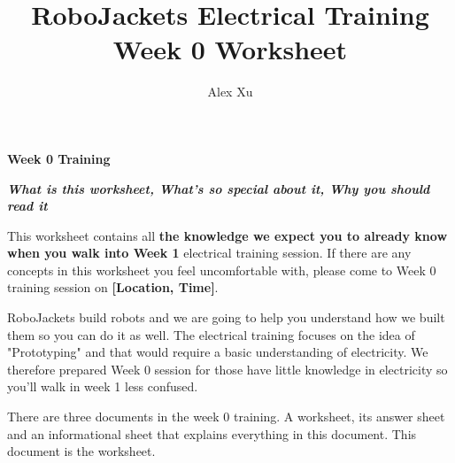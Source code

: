 \documentclass{article}
\title{RoboJackets Electrical Training Week 0 Worksheet}
\author{Alex Xu}
\begin{document}
\maketitle{}
\setcounter{tocdepth}{2}
\tableofcontents

\vspace{60pt}\Large{\textbf{Week 0 Training}}\vspace{6pt}\par
\large{\textit{\textbf{What is this worksheet, What's so special about it, Why you should read it}}} \vspace{6pt}\par
This worksheet contains all \textbf{the knowledge we expect you to already know when you walk into Week 1} electrical training session. If there are any concepts in this worksheet you feel uncomfortable with, please come to Week 0 training session on \textbf{[Location, Time]}.\vspace{6pt}\par
RoboJackets build robots and we are going to help you understand how we built them so you can do it as well. The electrical training  focuses on the idea of "Prototyping" and that would require a basic understanding of electricity. We therefore prepared Week 0 session for those have little knowledge in electricity so you'll walk in week 1 less confused. \vspace{6pt}\par
There are three documents in the week 0 training. A worksheet, its answer sheet and an informational sheet that explains everything in this document. This document is the worksheet. 

\pagebreak
\end{document}

